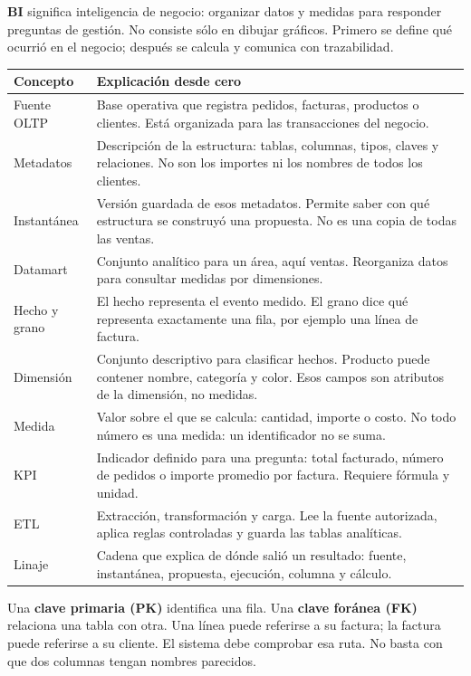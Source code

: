\textbf{BI} significa inteligencia de negocio: organizar datos y medidas para responder preguntas de gestión. No consiste sólo en dibujar gráficos. Primero se define qué ocurrió en el negocio; después se calcula y comunica con trazabilidad.
\begin{tabularx}{\linewidth}{@{}p{31mm}Y@{}}
\toprule
\textbf{Concepto}&\textbf{Explicación desde cero}\\
\midrule
Fuente OLTP&Base operativa que registra pedidos, facturas, productos o clientes. Está organizada para las transacciones del negocio.\\
Metadatos&Descripción de la estructura: tablas, columnas, tipos, claves y relaciones. No son los importes ni los nombres de todos los clientes.\\
Instantánea&Versión guardada de esos metadatos. Permite saber con qué estructura se construyó una propuesta. No es una copia de todas las ventas.\\
Datamart&Conjunto analítico para un área, aquí ventas. Reorganiza datos para consultar medidas por dimensiones.\\
Hecho y grano&El hecho representa el evento medido. El grano dice qué representa exactamente una fila, por ejemplo una línea de factura.\\
Dimensión&Conjunto descriptivo para clasificar hechos. Producto puede contener nombre, categoría y color. Esos campos son atributos de la dimensión, no medidas.\\
Medida&Valor sobre el que se calcula: cantidad, importe o costo. No todo número es una medida: un identificador no se suma.\\
KPI&Indicador definido para una pregunta: total facturado, número de pedidos o importe promedio por factura. Requiere fórmula y unidad.\\
ETL&Extracción, transformación y carga. Lee la fuente autorizada, aplica reglas controladas y guarda las tablas analíticas.\\
Linaje&Cadena que explica de dónde salió un resultado: fuente, instantánea, propuesta, ejecución, columna y cálculo.\\
\bottomrule
\end{tabularx}
Una \textbf{clave primaria (PK)} identifica una fila. Una \textbf{clave foránea (FK)} relaciona una tabla con otra. Una línea puede referirse a su factura; la factura puede referirse a su cliente. El sistema debe comprobar esa ruta. No basta con que dos columnas tengan nombres parecidos.

